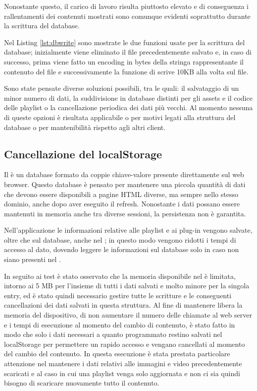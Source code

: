 Nonostante questo, il carico di lavoro risulta piuttosto elevato e di conseguenza i rallentamenti dei contenuti mostrati sono comunque evidenti soprattutto durante la scrittura del database. 



Nel Listing \ref*{lst:dbwrite} sono mostrate le due funzioni usate per la scrittura del database; inizialmente viene eliminato il file precedentemente salvato e, in caso di successo, prima viene fatto un encoding in bytes della stringa rappresentante il contenuto del file e successivamente la funzione di  scrive 10KB alla volta sul file.

Sono state pensate diverse soluzioni possibili, tra le quali: il salvataggio di un minor numero di dati, la suddivisione in database distinti per gli assets e il codice delle playlist o la cancellazione periodica dei dati più vecchi. Al momento nessuna di queste opzioni è risultata applicabile o per motivi legati alla struttura del database o per mantenibilità rispetto agli altri client.

\subsection{Cancellazione del localStorage} \label{freestorage}

Il  è un database formato da coppie chiave-valore presente direttamente sul web browser. Questo database è pensato per mantenere una piccola quantità di dati che devono essere disponibili a pagine HTML diverse, ma sempre nello stesso dominio, anche dopo aver eseguito il refresh. Nonostante i dati possano essere mantenuti in memoria anche tra diverse sessioni, la persistenza non è garantita.  

Nell'applicazione le informazioni relative alle playlist e ai plug-in vengono salvate, oltre che sul database, anche nel ; in questo modo vengono ridotti i tempi di accesso al dato, dovendo leggere le informazioni sul database solo in caso non siano presenti nel .

In seguito ai test è stato osservato che la memoria disponibile nel  è limitata, intorno ai 5 MB per l'insieme di tutti i dati salvati e molto minore per la singola entry, ed è stato quindi necessario gestire tutte le scritture e le conseguenti cancellazioni dei dati salvati in questa struttura. Al fine di mantenere libera la memoria del dispositivo, di non aumentare il numero delle chiamate al web server e i tempi di esecuzione al momento del cambio di contenuto, è stato fatto in modo che solo i dati necessari a quanto programmato restino salvati nel localStorage per permettere un rapido accesso e vengano cancellati al momento del cambio del contenuto. In questa esecuzione è stata prestata particolare attenzione nel mantenere i dati relativi alle immagini e video precedentemente scaricati e al caso in cui una playlist venga solo aggiornata e non ci sia quindi bisogno di scaricare nuovamente tutto il contenuto.

